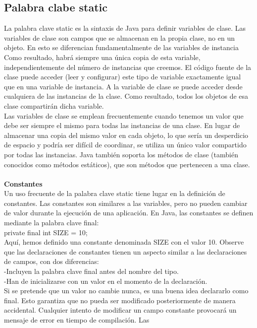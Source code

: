 \documentclass[11pt,a4paper]{article}
\begin{document}
\subsection{Palabra clabe static}
La palabra clave static es la sintaxis de Java para definir variables de clase. Las variables de
clase son campos que se almacenan en la propia clase, no en un objeto. En esto se diferencian fundamentalmente
de las variables de instancia\\
Como resultado,
habrá siempre una única copia de esta variable, independientemente del número de instancias que
creemos.
El código fuente de la clase puede acceder (leer y configurar) este tipo de variable exactamente
igual que en una variable de instancia. A la variable de clase se puede acceder desde cualquiera
de las instancias de la clase. Como resultado, todos los objetos de esa clase compartirán dicha
variable.\\
Las variables de clase se emplean frecuentemente cuando tenemos un valor que debe ser siempre
el mismo para todas las instancias de una clase. En lugar de almacenar una copia del mismo valor
en cada objeto, lo que sería un desperdicio de espacio y podría ser difícil de coordinar, se utiliza un
único valor compartido por todas las instancias.
Java también soporta los métodos de clase (también conocidos como métodos estáticos), que son
métodos que pertenecen a una clase.
\\
\\
\textbf{Constantes}\\
Un uso frecuente de la palabra clave static tiene lugar en la definición de constantes. Las constantes
son similares a las variables, pero no pueden cambiar de valor durante la ejecución de una
aplicación. En Java, las constantes se definen mediante la palabra clave final:\\
private final int SIZE = 10;\\
Aquí, hemos definido una constante denominada SIZE con el valor 10. Observe que las declaraciones
de constantes tienen un aspecto similar a las declaraciones de campos, con dos diferencias:\\
-Incluyen la palabra clave final antes del nombre del tipo.\\
-Han de inicializarse con un valor en el momento de la declaración.\\
Si se pretende que un valor no cambie nunca, es una buena idea declararlo como final. Esto
garantiza que no pueda ser modificado posteriormente de manera accidental. Cualquier intento
de modificar un campo constante provocará un mensaje de error en tiempo de compilación. Las
\end{document}
